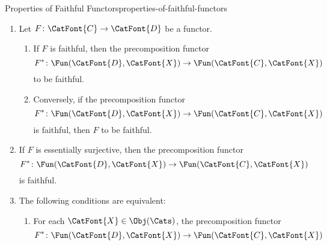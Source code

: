 \begin{proposition}{Properties of Faithful Functors}{properties-of-faithful-functors}
\begin{enumerate}
\begin{enumerate}
            \end{enumerate}
        \item\label{properties-of-faithful-functors-interaction-with-precomposition-1}Let $F\colon\CatFont{C}\to\CatFont{D}$ be a functor.
            \begin{enumerate}
                \item\label{properties-of-faithful-functors-interaction-with-precomposition-1-a}If $F$ is faithful, then the precomposition functor
                    \[
                        F^{*}
                        \colon
                        \Fun(\CatFont{D},\CatFont{X})
                        \to
                        \Fun(\CatFont{C},\CatFont{X})
                    \]%
                     to be faithful.
                \item\label{properties-of-faithful-functors-interaction-with-precomposition-1-b}Conversely, if the precomposition functor
                    \[
                        F^{*}
                        \colon
                        \Fun(\CatFont{D},\CatFont{X})
                        \to
                        \Fun(\CatFont{C},\CatFont{X})
                    \]%
                    is faithful, then $F$  to be faithful.
            \end{enumerate}
        \item\label{properties-of-faithful-functors-interaction-with-precomposition-2}If $F$ is essentially surjective, then the precomposition functor
            \[
                F^{*}
                \colon
                \Fun(\CatFont{D},\CatFont{X})
                \to
                \Fun(\CatFont{C},\CatFont{X})
            \]%
            is faithful.
        \item\label{properties-of-faithful-functors-interaction-with-precomposition-3}The following conditions are equivalent:
            \begin{enumerate}
                \item\label{properties-of-faithful-functors-interaction-with-precomposition-3-a}For each $\CatFont{X}\in\Obj(\Cats)$, the precomposition functor
                    \[
                        F^{*}
                        \colon
                        \Fun(\CatFont{D},\CatFont{X})
                        \to
                        \Fun(\CatFont{C},\CatFont{X})
                    \]%

\end{enumerate}
\end{enumerate}
\end{proposition}
